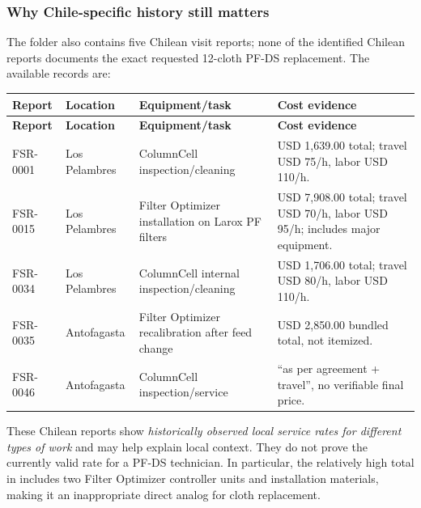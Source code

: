 \documentclass[11pt,a4paper]{article}
\DeclareRobustCommand{\code}[1]{{\ttfamily\small\detokenize{#1}}}
\begin{document}
\subsubsection{Why Chile-specific history still matters}
The folder also contains five Chilean visit reports; none of the identified Chilean reports documents the exact requested 12-cloth PF-DS replacement. The available records are:
\begin{longtable}{@{}L{23mm}L{27mm}L{48mm}L{47mm}@{}}
\toprule\textbf{Report} & \textbf{Location} & \textbf{Equipment/task} & \textbf{Cost evidence}\\\midrule\endfirsthead
\toprule\textbf{Report} & \textbf{Location} & \textbf{Equipment/task} & \textbf{Cost evidence}\\\midrule\endhead
FSR-0001 & Los Pelambres & ColumnCell inspection/cleaning & USD 1,639.00 total; travel USD 75/h, labor USD 110/h.\\
FSR-0015 & Los Pelambres & Filter Optimizer installation on Larox PF filters & USD 7,908.00 total; travel USD 70/h, labor USD 95/h; includes major equipment.\\
FSR-0034 & Los Pelambres & ColumnCell internal inspection/cleaning & USD 1,706.00 total; travel USD 80/h, labor USD 110/h.\\
FSR-0035 & Antofagasta & Filter Optimizer recalibration after feed change & USD 2,850.00 bundled total, not itemized.\\
FSR-0046 & Antofagasta & ColumnCell inspection/service & ``as per agreement + travel'', no verifiable final price.\\
\bottomrule
\end{longtable}

These Chilean reports show \emph{historically observed local service rates for different types of work} and may help explain local context. They do not prove the currently valid rate for a PF-DS technician. In particular, the relatively high total in \code{FSR-0015} includes two Filter Optimizer controller units and installation materials, making it an inappropriate direct analog for cloth replacement.
\end{document}
